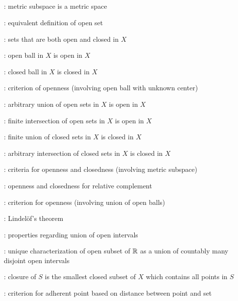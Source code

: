 \subsection*{}
\item {}: metric subspace is a metric space
\item {}: equivalent definition of open set
\item {}: sets that are both open and closed in \(X\)
\item {}: open ball in \(X\) is open in \(X\)
\item {}: closed ball in \(X\) is closed in \(X\)
\item {}: criterion of openness (involving open ball with unknown center)
\item {}: arbitrary union of open sets in \(X\) is open in \(X\)
\item {}: finite intersection of open sets in \(X\) is open in \(X\)
\item {}: finite union of closed sets in \(X\) is closed in \(X\)
\item {}: arbitrary intersection of closed sets in \(X\) is closed in \(X\)
\item {}: criteria for
openness and closedness (involving metric subspace)
\item {}: openness and closedness for relative complement
\item {}: criterion for openness (involving union of open balls)
\item {}: Lindel\"of's theorem
\item {}: properties regarding union of open intervals
\item {}: unique characterization of open subset of
\(\mathbb{R}\) as a union of countably many disjoint open intervals
\item {}: closure of \(S\) is the smallest closed subset of \(X\) which contains all points in \(S\)
\item {}: criterion for adherent point based on distance between point and set
